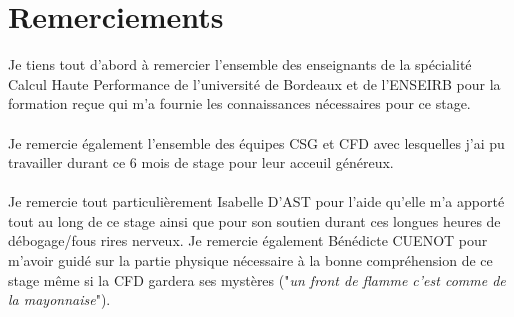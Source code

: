 \section*{Remerciements}%
Je tiens tout d'abord à remercier l'ensemble des enseignants de la spécialité Calcul Haute Performance de l'université de Bordeaux et de l'ENSEIRB pour la formation reçue qui m'a fournie les connaissances nécessaires pour ce stage.

\paragraph{}Je remercie également l'ensemble des équipes CSG et CFD avec lesquelles j'ai pu travailler durant ce 6 mois de stage pour leur acceuil généreux.

\paragraph{}Je remercie tout particulièrement Isabelle D'AST pour l'aide qu'elle m'a apporté tout au long de ce stage ainsi que pour son soutien durant ces longues heures de débogage/fous rires nerveux. Je remercie également Bénédicte CUENOT pour m'avoir guidé sur la partie physique nécessaire à la bonne compréhension de ce stage même si la CFD gardera ses mystères ("\textit{un front de flamme c'est comme de la mayonnaise}").
